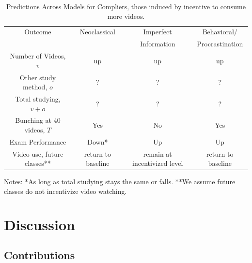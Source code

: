 \documentclass[12pt]{article}
\begin{document}
\begin{table}
	\caption{Predictions Across Models for Compliers, those induced by incentive to consume more videos.}
	\centering
	\begin{tabular}{ c|c|c|c }
		Outcome & Neoclassical & Imperfect& Behavioral/ \\
		& & Information & Procrastination\\
		\hline
		Number of Videos, $v$ & up & up & up \\
		Other study method, $o$ & ?
		& ? & ?\\
		Total studying, $v+o$ & ?
		& ? & ? \\
		Bunching at 40 videos, $T$ & Yes & No & Yes \\
		Exam Performance & Down* & Up & Up\\
		Video use, future classes** & return to baseline & remain at incentivized level & return to baseline \\
		\hline
	\end{tabular}
	Notes: *As long as total studying stays the same or falls.
	**We assume future classes do not incentivize video watching.
	\label{tab:modelpredictions}

\end{table}



\section{Discussion} \label{sec:discussion}

\subsection{Contributions}\label{subsec:contributions}
\end{document}
